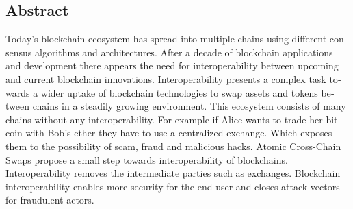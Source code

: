 

\begin{otherlanguage}{american}
	\chapter*{Abstract}
	Today’s blockchain ecosystem has spread into multiple chains using different
	consensus algorithms and architectures. After a decade of blockchain
	applications and development there appears the need for interoperability between
	upcoming and current blockchain innovations. Interoperability presents
	a complex task towards a wider uptake of blockchain technologies to swap
	assets and tokens between chains in a steadily growing environment.
	This ecosystem consists of many chains without any interoperability. For example if Alice wants to trade her bitcoin with Bob's ether
	they have to use a centralized exchange. Which exposes them to the possibility of scam, fraud and malicious hacks.
	Atomic Cross-Chain Swaps propose a small step towards interoperability of blockchains. Interoperability removes the intermediate parties such as exchanges.
	Blockchain interoperability enables more security for the end-user and closes attack vectors for fraudulent actors.
	
	
\end{otherlanguage}
